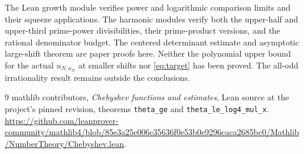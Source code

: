 \documentclass[11pt]{article}
\begin{document}
The Lean growth module verifies power and logarithmic comparison limits
and their squeeze applications. The harmonic modules verify both the
upper-half and upper-third prime-power divisibilities, their prime-product
versions, and the rational denominator budget. The centered determinant
estimate and asymptotic large-shift theorem are paper proofs here.
Neither the polynomial upper bound for the actual
$u_{N,a_N}$ at smaller shifts nor \eqref{eq:target} has been proved.
The all-odd irrationality result remains outside the conclusions.

\begin{thebibliography}{9}
\small
{}
mathlib contributors, \emph{Chebyshev functions and estimates},
Lean source at the project's pinned revision, theorems
\texttt{theta\_ge} and \texttt{theta\_le\_log4\_mul\_x}.
\url{https://github.com/leanprover-community/mathlib4/blob/85e3a25e006c35636f0e53b0e9296caca2685bc0/Mathlib/NumberTheory/Chebyshev.lean}.
\end{thebibliography}
\end{document}
